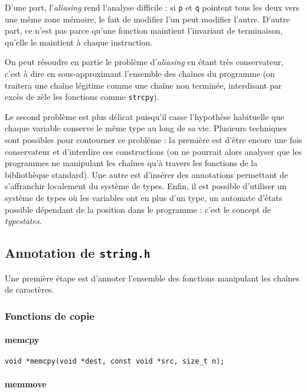 D'une part, l'\emph{aliasing} rend l'analyse difficile : si \texttt{p} et
\texttt{q} pointent tous les deux vers une même zone mémoire, le fait de
modifier l'un peut modifier l'autre. D'autre part, ce n'est pas parce qu'une
fonction maintient l'invariant de terminaison, qu'elle le maintient à chaque
instruction.

On peut résoudre en partie le problème d'\emph{aliasing} en étant très
conservateur, c'est à dire en sous-approximant l'ensemble des chaînes du
programme (on traitera une chaîne légitime comme une chaîne non terminée,
interdisant par excès de zèle les fonctions comme \texttt{strcpy}).

Le second problème est plus délicat puisqu'il casse l'hypothèse habituelle que
chaque variable conserve le même type au long de sa vie. Plusieurs techniques
sont possibles pour contourner ce problème : la première est d'être encore une
fois conservateur et d'interdire ces constructions (on ne pourrait alors
analyser que les programmes ne manipulant les chaînes qu'à travers les fonctions
de la bibliothèque standard). Une autre est d'insérer des annotations permettant
de s'affranchir localement du système de types. Enfin, il est possible
d'utiliser un système de types où les variables ont en plus d'un type, un
automate d'états possible dépendant de la position dans le programme : c'est le
concept de \emph{typestates}\cite{tse12-typestate}.

\subsection{Annotation de \texttt{string.h}}

Une première étape est d'annoter l'ensemble des fonctions manipulant les chaînes
de caractères.

\subsubsection{Fonctions de copie}

\paragraph{memcpy}

\begin{Verbatim}
void *memcpy(void *dest, const void *src, size_t n);
\end{Verbatim}

\paragraph{memmove}

